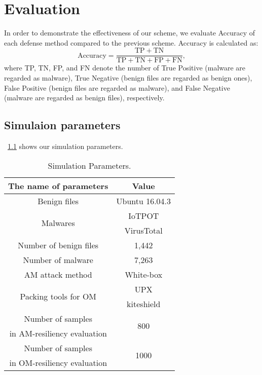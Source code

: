 \chapter{Evaluation}\label{sec:evaluation} 
In order to demonstrate the effectiveness of our scheme, we evaluate Accuracy of each defense method compared to the previous scheme.
Accuracy is calculated as:
\begin{equation}
  \mathrm{Accuracy} = \frac{\mathrm{TP}+\mathrm{TN}}{\mathrm{TP} + \mathrm{TN} + \mathrm{FP} + \mathrm{FN}}, 
\end{equation}
where TP, TN, FP, and FN denote the number of True Positive (malware are regarded as malware), True Negative (benign files are regarded as benign ones), False Positive (benign files are regarded as malware), and False Negative (malware are regarded as benign files), respectively.  

\section{Simulaion parameters}
\tablename~\ref{tab:simulation_parameters} shows our simulation parameters.  
\begin{table}[p]
	\begin{center}
		\caption{Simulation Parameters.}
		\label{tab:simulation_parameters} 
		\begin{tabular}{|c|c|} \hline
			The name of parameters & Value\\ \hline \hline
			Benign files & Ubuntu 16.04.3\cite{ubuntu}\\ \hline
			\multirow{2}{*}{\hfill Malwares  \hfill} & IoTPOT\cite{iotpot} \\ 
																							 & VirusTotal\cite{virustotal}\\ \hline
			Number of benign files  & 1,442 \\  \hline
			Number of malware  &  7,263 \\ \hline
			AM attack method & White-box \cite{am, yamafumi} \\ \hline
			\multirow{2}{*}{\hfill Packing tools for OM  \hfill} & UPX\cite{upx} \\ & kiteshield\cite{kiteshield} \\ \hline
			Number of samples  & \multirow{2}{*}{\hfill 800 \hfill} \\  
			in AM-resiliency evaluation & \\ \hline 
			Number of samples  & \multirow{2}{*}{\hfill 1000 \hfill} \\  
			in OM-resiliency evaluation & \\ \hline 
		\end{tabular}
	\end{center}
\end{table} 


